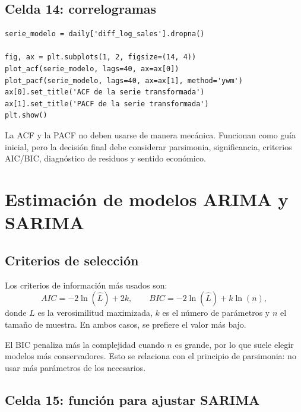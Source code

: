\documentclass[11pt,letterpaper]{article}
\begin{document}
\subsection{Celda 14: correlogramas}

\begin{lstlisting}[style=pythoncolab]
serie_modelo = daily['diff_log_sales'].dropna()

fig, ax = plt.subplots(1, 2, figsize=(14, 4))
plot_acf(serie_modelo, lags=40, ax=ax[0])
plot_pacf(serie_modelo, lags=40, ax=ax[1], method='ywm')
ax[0].set_title('ACF de la serie transformada')
ax[1].set_title('PACF de la serie transformada')
plt.show()
\end{lstlisting}

\begin{advertencia}
La ACF y la PACF no deben usarse de manera mecánica. Funcionan como guía inicial, pero la decisión final debe considerar parsimonia, significancia, criterios AIC/BIC, diagnóstico de residuos y sentido económico.
\end{advertencia}

\section{Estimación de modelos ARIMA y SARIMA}

\subsection{Criterios de selección}

\begin{latexcell}
Los criterios de información más usados son:
\[
AIC = -2\ln(\hat L)+2k,
\qquad
BIC = -2\ln(\hat L)+k\ln(n),
\]
donde \(\hat L\) es la verosimilitud maximizada, \(k\) es el número de parámetros y \(n\) el tamaño de muestra. En ambos casos, se prefiere el valor más bajo.
\end{latexcell}

\begin{interpretacion}
El BIC penaliza más la complejidad cuando \(n\) es grande, por lo que suele elegir modelos más conservadores. Esto se relaciona con el principio de parsimonia: no usar más parámetros de los necesarios.
\end{interpretacion}

\subsection{Celda 15: función para ajustar SARIMA}
\end{document}
